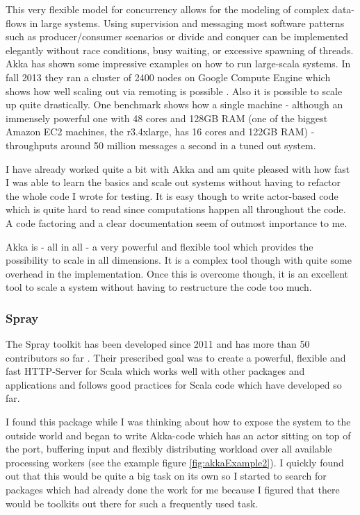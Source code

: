 \documentclass[twoside, 11pt]{scrartcl}
\begin{document}
This very flexible model for concurrency allows for the modeling of complex data-flows in large systems. Using supervision and messaging most software patterns such as producer/consumer scenarios or divide and conquer can be implemented elegantly without race conditions, busy waiting, or excessive spawning of threads. Akka has shown some impressive examples on how to run large-scala systems. In fall 2013 they ran a cluster of 2400 nodes on Google Compute Engine which shows how well scaling out via remoting is possible \cite{link:akkaCluster}. Also it is possible to scale up quite drastically. One benchmark shows how a single machine - although an immensely powerful one with 48 cores and 128GB RAM (one of the biggest Amazon EC2 machines, the r3.4xlarge, has 16 cores and 122GB RAM) \cite{link:ec2Pricing} - throughputs around 50 million messages a second in a tuned out system. \cite{link:akkaScaleUp}

I have already worked quite a bit with Akka and am quite pleased with how fast I was able to learn the basics and scale out systems without having to refactor the whole code I wrote for testing. It is easy though to write actor-based code which is quite hard to read since computations happen all throughout the code. A code factoring and a clear documentation seem of outmost importance to me.

Akka is - all in all - a very powerful and flexible tool which provides the possibility to scale in all dimensions. It is a complex tool though with quite some overhead in the implementation. Once this is overcome though, it is an excellent tool to scale a system without having to restructure the code too much.


\subsubsection{Spray}
The Spray toolkit has been developed since 2011 \cite{link:sprayChangelog} and has more than 50 contributors so far \cite{link:sprayGithub}. Their prescribed goal was to create a powerful, flexible and fast HTTP-Server for Scala which works well with other packages and applications and follows good practices for Scala code which have developed so far.

I found this package while I was thinking about how to expose the system to the outside world and began to write Akka-code which has an actor sitting on top of the port, buffering input and flexibly distributing workload over all available processing workers (see the example figure \ref{fig:akkaExample2}). I quickly found out that this would be quite a big task on its own so I started to search for packages which had already done the work for me because I figured that there would be toolkits out there for such a frequently used task. 
\end{document}
